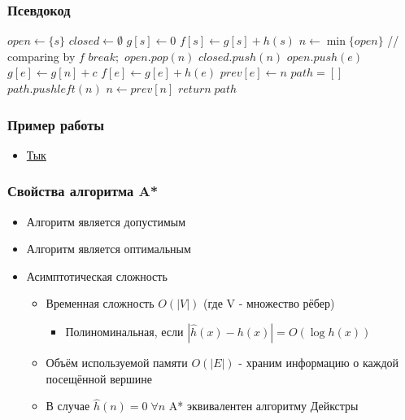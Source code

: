 \documentclass{style}
\begin{document}
\begin{frame}[fragile]
    \frametitle{Псевдокод}
    \begin{tiny}
        \begin{algorithmic}[1]
            \State $open \leftarrow \{s\}$
            \State $closed \leftarrow \emptyset$
            \State $g[s] \leftarrow 0$
            \State $f[s] \leftarrow g[s] + h(s)$
                \State $n \leftarrow \min\{open\}$ // comparing by $f$
                    \State $break;$
                \EndIf
                \State $open.pop(n)$
                \State $closed.push(n)$
                        \State $open.push(e)$
                        \State $g[e] \leftarrow g[n] + c$
                        \State $f[e] \leftarrow g[e] + h(e)$
                        \State $prev[e] \leftarrow n$
                    \EndIf
                \EndFor
            \EndWhile
            \State $path = []$ 
                \State $path.pushleft(n)$
                \State $n \leftarrow prev[n]$
            \EndWhile
            \State $return \; path$
        \EndProcedure
        \end{algorithmic}
    \end{tiny}
\end{frame}

\begin{frame}
    \frametitle{Пример работы}
    \begin{itemize}
        \item \href{https://frolov.icu/astar/example}{Тык}
    \end{itemize}
\end{frame}

\begin{frame}
    \frametitle{Свойства алгоритма A*}
    \begin{itemize}
        \item Алгоритм является допустимым
        \item Алгоритм является оптимальным
        \item Асимптотическая сложность
        \begin{itemize}
            \item Временная сложность $O(|V|)$ (где V - множество рёбер)
            \begin{itemize}
                \item Полиноминальная, если $|\hat{h}(x) - h(x)| = O(\log h(x))$
            \end{itemize}
            \item Объём используемой памяти $O(|E|)$ - храним информацию о каждой посещённой вершине
        \item В случае $\hat{h}(n) = 0 \; \forall n$ A* эквивалентен алгоритму Дейкстры
        \end{itemize}
    \end{itemize}
\end{frame}
\end{document}
